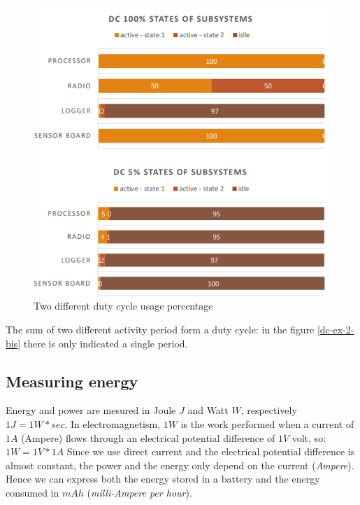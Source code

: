 \documentclass[10pt,a4paper]{report}
\theoremstyle{definition}
\begin{document}
\begin{figure}[h]
	\centering\includegraphics[scale=0.40]{images/Pasted image 20230324171858.png}
	\caption{Two different duty cycle usage percentage}
	\label{dc-ex-2}
\end{figure}

The sum of two different activity period form a duty cycle: in the figure \ref{dc-ex-2-bis} there is only indicated a single period.
\subsection{Measuring energy}\label{sec:measuring-energy}
Energy and power are mesured in Joule $J$ and Watt $W$, respectively $1J = 1W *sec$. In electromagnetism, $1W$ is the work performed when a current of $1A$ (Ampere) flows through an electrical potential difference of $1V$ volt, so:
$1W = 1V * 1A$
Since we use direct current and the electrical potential difference is almost constant, the power and the energy only depend on the current (\textit{Ampere}).
Hence we can express both the energy stored in a battery and the energy consumed in $mAh$ (\textit{milli-Ampere per hour}).
\end{document}
